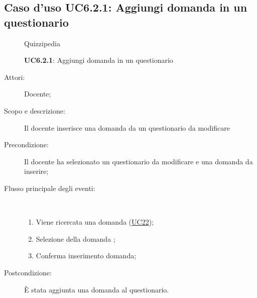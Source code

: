 \subsection{Caso d'uso UC6.2.1: Aggiungi domanda in un questionario}
	\begin{figure}[H]
		\centering
		\begin{resizedtikzpicture}{\textwidth}
		\begin{umlsystem}[x=0, fill=lightgray!20]{Quizzipedia}
		\end{umlsystem}
		\end{resizedtikzpicture}
		\caption{\textbf{UC6.2.1}: Aggiungi domanda in un questionario}
		\label{UC6.2.1}
	\end{figure}
\begin{description}
\item[Attori:] Docente;
\item[Scopo e descrizione:] Il docente inserisce una domanda da un questionario da modificare
      \item[Precondizione:] Il docente ha selezionato un questionario da modificare e una domanda da inserire;

        \item[Flusso principale degli eventi:] \ 
 \begin{enumerate}
          \item Viene ricercata una domanda (\hyperlink{UC22}{UC22});
          \item Selezione della domanda	;
          \item Conferma inserimento domanda;

      \end{enumerate}
    \item[Postcondizione:] È stata aggiunta una domanda al questionario.
  \end{description}
\hypertarget{UC6.2.2}{}
